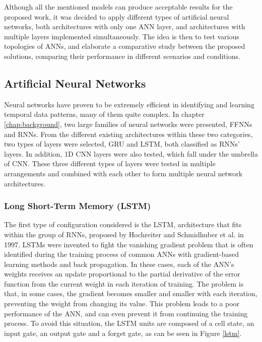 Although all the mentioned models can produce acceptable results for the proposed work, it was decided to apply different types of artificial neural networks, both architectures with only one \ac{ANN} layer, and architectures with multiple layers implemented simultaneously. The idea is then to test various topologies of \ac{ANN}s, and elaborate a comparative study between the proposed solutions, comparing their performance in different scenarios and conditions.

\subsection{Artificial Neural Networks}\label{chap3:subsec:artificial_neural_networks}

Neural networks have proven to be 
extremely efficient in identifying and learning temporal data patterns, many of them quite complex. In chapter \ref{chap:background}, two large families of neural networks were presented, \ac{FFNN}s and \ac{RNN}s. From the different existing architectures within these two categories, two types of layers were selected, \ac{GRU} and \ac{LSTM}, both classified as \ac{RNN}s' layers. In addition, \ac{1D CNN} layers were also tested, which fall under the umbrella of \ac{CNN}. These three different types of layers were tested in multiple arrangements and combined with each other to form multiple neural network architectures.

\subsubsection{Long Short-Term Memory (LSTM)}\label{chap3:subsubsec:lstm}

The first type of configuration considered is the \ac{LSTM}, architecture that fits within the group of \ac{RNN}s, proposed by Hochreiter and Schmidhuber et al. \cite{lstm0} in 1997. \ac{LSTM}s were invented to fight the vanishing gradient problem that is often identified during the training process of common \ac{ANN}s with gradient-based learning methods and back propagation. In these cases, each of the \ac{ANN}'s weights receives an update proportional to the partial derivative of the error function from the current weight in each iteration of training. The problem is that, in some cases, the gradient becomes smaller and smaller with each iteration, preventing the weight from changing its value. This problem leads to a poor performance of the \ac{ANN}, and can even prevent it from continuing the training process. To avoid this situation, the \ac{LSTM} units are composed of a cell state, an input gate, an output gate and a forget gate, as can be seen in Figure \ref{lstm}.

